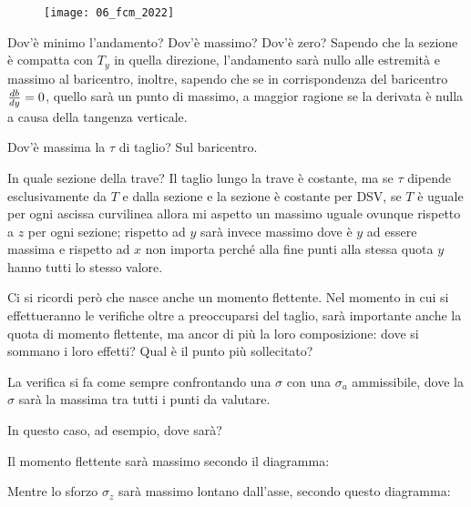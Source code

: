 \documentclass{article}
\begin{document}
\begin{figure}[H]
	\texttt{[image: 06\_fcm\_2022]}
\end{figure}
\begin{adjustwidth}{2in}{}
		Dov'è minimo l'andamento? Dov'è massimo? Dov'è zero? Sapendo che la sezione è compatta con $T_y$ in quella direzione, l'andamento sarà nullo alle estremità e massimo al baricentro, inoltre, sapendo che se in corrispondenza del baricentro \({db\over dy}=0\), quello sarà un punto di massimo, a maggior ragione se la derivata è nulla a causa della tangenza verticale. \newline 
		
		Dov'è massima la $\tau$ di taglio? Sul baricentro. 
		
		In quale sezione della trave? Il taglio lungo la trave è costante, ma se $\tau$ dipende esclusivamente da $T$ e dalla sezione e la sezione è costante per DSV, se $T$ è uguale per ogni ascissa curvilinea allora mi aspetto un massimo uguale ovunque rispetto a $z$ per ogni sezione; rispetto ad $y$ sarà invece massimo dove è $y$ ad essere massima e rispetto ad $x$ non importa perché alla fine punti alla stessa quota $y$ hanno tutti lo stesso valore. \newline 
		
		Ci si ricordi però che nasce anche un momento flettente. Nel momento in cui si effettueranno le verifiche oltre a preoccuparsi del taglio, sarà importante anche la quota di momento flettente, ma ancor di più la loro composizione: dove si sommano i loro effetti? Qual è il punto più sollecitato? 
		
		La verifica si fa come sempre confrontando una $\sigma$ con una $\sigma_a$ ammissibile, dove la $\sigma$ sarà la massima tra tutti i punti da valutare. 
		
		In questo caso, ad esempio, dove sarà? 
		
		Il momento flettente sarà massimo secondo il diagramma:
		
\begin{figure}[H]
	\centering
\end{figure}

		Mentre lo sforzo $\sigma_z$ sarà massimo lontano dall'asse, secondo questo diagramma:
		
\begin{figure}[H]
	\centering
\end{figure}


\end{adjustwidth}
\end{document}
